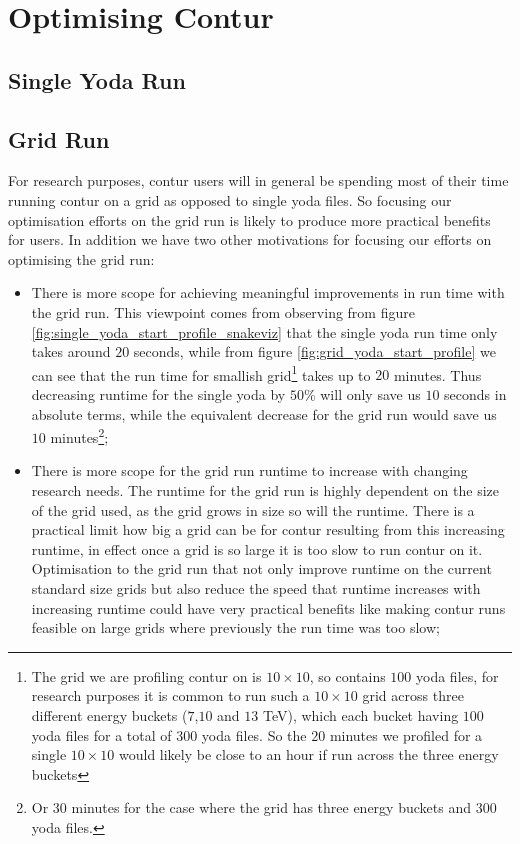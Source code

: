 \chapter{Optimising Contur}
\label{chapterlabel5}

\section{Single Yoda Run}


\section{Grid Run}

For research purposes, contur users will in general be spending most of their time running contur on a grid as opposed to single yoda files. So focusing our optimisation efforts on the grid run is likely to produce more practical benefits for users. In addition we have two other motivations for focusing our efforts on optimising the grid run:

\begin{itemize}
\item There is more scope for achieving meaningful improvements in run time with the grid run. This viewpoint comes from observing from figure \ref{fig:single_yoda_start_profile_snakeviz} that the single yoda run time only takes around $20$ seconds, while from figure \ref{fig:grid_yoda_start_profile} we can see that the run time for smallish grid\footnote{The grid we are profiling contur on is $10 \times 10$, so contains $100$ yoda files, for research purposes it is common to run such a $10 \times 10$ grid across three different energy buckets ($7$,$10$ and $13$ TeV), which each bucket having $100$ yoda files for a total of $300$ yoda files. So the $20$ minutes we profiled for a single $10 \times 10$ would likely be close to an hour if run across the three energy buckets} takes up to $20$ minutes. Thus decreasing runtime for the single yoda by $50\%$ will only save us $10$ seconds in absolute terms, while the equivalent decrease for the grid run would save us $10$ minutes\footnote{Or $30$ minutes for the case where the grid has three energy buckets and $300$ yoda files.};
\item There is more scope for the grid run runtime to increase with changing research needs. The runtime for the grid run is highly dependent on the size of the grid used, as the grid grows in size so will the runtime. There is a practical limit how big a grid can be for contur resulting from this increasing runtime, in effect once a grid is so large it is too slow to run contur on it. Optimisation to the grid run that not only improve runtime on the current standard size grids but also reduce the speed that runtime increases with increasing runtime could have very practical benefits like making contur runs feasible on large grids where previously the run time was too slow;
\end{itemize}

